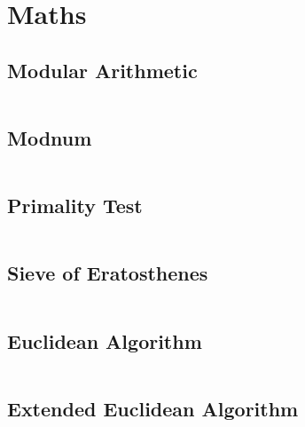 \section{Maths}
  \subsection{Modular Arithmetic}
    \inputminted{cpp}{library/maths/mod.hpp}
  \subsection{Modnum}
    \inputminted{cpp}{library/maths/modnum.hpp}
  \subsection{Primality Test}
    \inputminted{cpp}{library/maths/primality.hpp}
  \subsection{Sieve of Eratosthenes}
    \inputminted{cpp}{library/maths/sieve.hpp}
  \subsection{Euclidean Algorithm}
    \inputminted{cpp}{library/maths/euclidean.hpp}
  \subsection{Extended Euclidean Algorithm}
    \inputminted{cpp}{library/maths/eea.hpp}